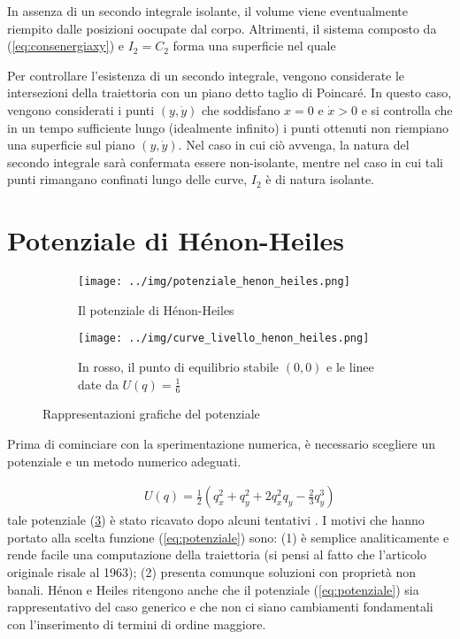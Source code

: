 \documentclass[a4paper]{article}
\numberwithin{equation}{section}
\numberwithin{figure}{section}
\begin{document}
In assenza di un secondo integrale isolante, il volume viene eventualmente riempito
dalle posizioni oocupate dal corpo.
Altrimenti, il sistema composto da (\ref{eq:consenergiaxy}) e $I_2 = C_2$ forma una
superficie nel quale 

Per controllare l'esistenza di un secondo integrale, vengono considerate le intersezioni della
traiettoria con un piano detto taglio di Poincaré. In questo caso, vengono considerati i punti
$(y,\dot{y})$ che soddisfano $x=0$ e $\dot{x}>0$ e si controlla che in un tempo sufficiente lungo
(idealmente infinito) i punti ottenuti non riempiano una superficie sul piano $(y,\dot{y})$. Nel
caso in cui ciò avvenga, la natura del secondo integrale sarà confermata essere non-isolante, mentre
nel caso in cui tali punti rimangano confinati lungo delle curve, $I_2$ è di natura isolante.

\section{Potenziale di Hénon-Heiles}

\begin{figure}[h!]
	\centering
	\begin{subfigure}[t]{.5\textwidth}
		\centering
		\texttt{[image: ../img/potenziale\_henon\_heiles.png]}
		\caption{Il potenziale di Hénon-Heiles}
		\label{img:potenziale3d}
	\end{subfigure}%
	\begin{subfigure}[t]{.5\textwidth}
		\centering
		\texttt{[image: ../img/curve\_livello\_henon\_heiles.png]}
		\caption{In rosso, il punto di equilibrio stabile $(0,0)$ e le linee date da
		$U(q)=\frac{1}{6}$} 
		\label{img:curvelivello}
	\end{subfigure}
	\caption{Rappresentazioni grafiche del potenziale}
	\label{img:potenzialehh}
\end{figure}

Prima di cominciare con la sperimentazione numerica, è necessario scegliere un potenziale e un
metodo numerico adeguati.

\begin{eqnarray}	
	&&U(q) = \frac{1}{2}(q_x^2+q_y^2+2q_x^2q_y-\frac{2}{3}q_y^3) \label{eq:potenziale}
\end{eqnarray}
tale potenziale (\ref{img:potenzialehh}) è stato ricavato dopo alcuni tentativi
\cite{1964henonheiles}.
I motivi che hanno portato alla scelta funzione (\ref{eq:potenziale}) sono: (1)
è semplice analiticamente e rende facile una computazione della traiettoria (si pensi al fatto
che l'articolo originale risale al 1963);
(2) presenta comunque soluzioni con proprietà non banali\cite{hairer}. 
Hénon e Heiles ritengono anche che il potenziale (\ref{eq:potenziale}) sia rappresentativo del caso
generico e che non ci siano cambiamenti fondamentali con l'inserimento di termini di ordine maggiore.
\end{document}

